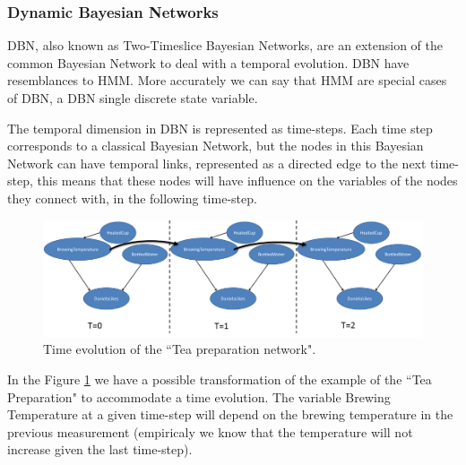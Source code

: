 \subsubsection{Dynamic Bayesian Networks}
\ac{DBN}, also known as Two-Timeslice Bayesian Networks, are an extension of the common Bayesian Network to deal with a temporal evolution\cite{eemcs5901}. \ac{DBN} have resemblances to \ac{HMM}. More accurately we can say that \ac{HMM} are special cases of \ac{DBN}, a \ac{DBN} single discrete state variable\cite{Norvig2003}. 

The temporal dimension in \ac{DBN} is represented as time-steps. Each time step corresponds to a classical Bayesian Network, but the nodes in this Bayesian Network can have temporal links, represented as a directed edge to the next time-step, this means that these nodes will have influence on the variables of the nodes they connect with, in the following time-step.

\begin{figure}[h]
\centering 

\includegraphics[scale=0.48]{Overview/Figures/TeaPreparationNetworkDBN.png}
\caption{Time evolution of the ``Tea preparation network".}
\label{fig:tea_networkdbn}
\end{figure}

In the Figure \ref{fig:tea_networkdbn} we have a possible transformation of the example of the ``Tea Preparation" to accommodate a time evolution. The variable Brewing Temperature at a given time-step will depend on the brewing temperature in the previous measurement (empiricaly we know that the temperature will not increase given the last time-step). 


